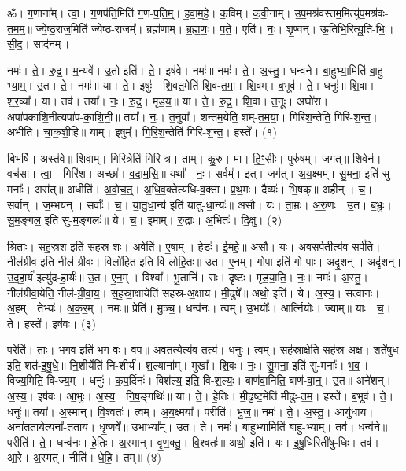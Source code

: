 
ॐ। ग॒णाना᳚म्। त्वा॒। ग॒णप॑ति॒मिति॑ ग॒ण-प॒ति॒म्॒। ह॒वा॒म॒हे॒। क॒विम्। क॒वी॒नाम्। उ॒प॒मश्र॑वस्तम॒मित्यु॑प॒मश्र॑वः-त॒म॒म्॒॥ 
ज्ये॒ष्ठ॒राज॒मिति॑ ज्येष्ठ-राजम्᳚। ब्रह्म॑णाम्। ब्र॒ह्म॒णः॒। प॒ते॒। एति॑। नः॒। शृ॒ण्वन्। ऊ॒तिभि॒रित्यू॒ति-भिः॒। सी॒द॒। साद॑नम्॥ 


नमः॑। ते॒। रु॒द्र॒। म॒न्यवे᳚। उ॒तो इति॑। ते॒। इष॑वे। नमः॑॥ 
नमः॑। ते॒। अ॒स्तु॒। धन्व॑ने। बा॒हुभ्या॒मिति॑ बा॒हु-भ्या॒म्॒। उ॒त। ते॒। नमः॑॥ 
या। ते॒। इषुः॑। शि॒वत॒मेति॑ शि॒व-त॒मा॒। शि॒वम्। ब॒भूव॑। ते॒। धनुः॑॥ 
शि॒वा। श॒र॒व्या᳚। या। तव॑। तया᳚। नः॒। रु॒द्र॒। मृ॒ड॒य॒॥ 
या। ते॒। रु॒द्र॒। शि॒वा। त॒नूः। अघो॑रा। अपा॑पकाशि॒नीत्यपा॑प-का॒शि॒नी॒॥ 
तया᳚। नः॒। त॒नुवा᳚। शन्त॑म॒येति॒ शम्-त॒म॒या॒। गिरि॑श॒न्तेति॒ गिरि॑-श॒न्त॒। अभीति॑। चा॒क॒शी॒हि॒॥ 
याम्। इषुम्᳚। गि॒रि॒श॒न्तेति॑ गिरि-श॒न्त॒। हस्ते᳚। (१)


बिभ॑र्षि। अस्त॑वे॥ 
शि॒वाम्। गि॒रि॒त्रेति॑ गिरि-त्र॒। ताम्। कु॒रु॒। मा। हि॒ꣳ॒सीः॒। पुरु॑षम्। जग॑त्॥ 
शि॒वेन॑। वच॑सा। त्वा॒। गिरि॑श। अच्छा॑। व॒दा॒म॒सि॒॥ 
यथा᳚। नः॒। सर्वम्᳚। इत्। जग॑त्। अ॒य॒क्ष्मम्। सु॒मना॒ इति॑ सु-मनाः᳚। अस॑त्॥ 
अधीति॑। अ॒वो॒च॒त्॒। अ॒धि॒व॒क्तेत्य॑धि-व॒क्ता। प्र॒थ॒मः। दैव्यः॑। भि॒षक्॥ 
अहीन्। च॒। सर्वान्। ज॒म्भयन्। सर्वाः᳚। च॒। या॒तु॒धा॒न्य॑ इति॑ यातु-धा॒न्यः॑॥ 
असौ। यः। ता॒म्रः। अ॒रु॒णः। उ॒त। ब॒भ्रुः। सु॒म॒ङ्गल॒ इति॑ सु-म॒ङ्गलः॑॥ 
ये। च॒। इ॒माम्। रु॒द्राः। अ॒भितः॑। दि॒क्षु। (२)


श्रि॒ताः। स॒ह॒स्र॒श इति॑ सहस्र-शः। अवेति॑। ए॒षा॒म्। हेडः॑। ई॒म॒हे॒॥ 
असौ। यः। अ॒व॒सर्प॒तीत्य॑व-सर्प॑ति। नील॑ग्रीव॒ इति॒ नील॑-ग्री॒वः॒। विलो॑हित॒ इति॒ वि-लो॒हि॒तः॒॥ 
उ॒त। ए॒न॒म्॒। गो॒पा इति॑ गो-पाः। अ॒दृ॒श॒न्। अदृ॑शन्। उ॒द॒हा॒र्य॑ इत्यु॑द-हा॒र्यः॑॥ 
उ॒त। ए॒न॒म्। विश्वा᳚। भू॒तानि॑। सः। दृ॒ष्टः। मृ॒ड॒या॒ति॒। नः॒॥ 
नमः॑। अ॒स्तु॒। नील॑ग्रीवा॒येति॒ नील॑-ग्री॒वा॒य॒। स॒ह॒स्रा॒क्षायेति॑ सहस्र-अ॒क्षाय॑। मी॒ढुषे᳚॥
अथो॒ इति॑। ये। अ॒स्य॒। सत्वा॑नः। अ॒हम्। तेभ्यः॑। अ॒क॒र॒म्। नमः॑॥ 
प्रेति॑। मु॒ञ्च॒। धन्व॑नः। त्वम्। उ॒भयोः᳚। आर्त्नि॑योः। ज्याम्॥ 
याः। च॒। ते॒। हस्ते᳚। इष॑वः। (३)


परेति॑। ताः। भ॒ग॒व॒ इति॑ भग-वः॒। व॒प॒॥ 
अ॒व॒तत्येत्य॑व-तत्य॑। धनुः॑। त्वम्। सह॑स्रा॒क्षेति॒ सह॑स्र-अ॒क्ष॒। शते॑षुध॒ इति॒ शत॑-इ॒षु॒धे॒॥ 
नि॒शीर्येति॑ नि-शीर्य॑। श॒ल्याना᳚म्। मुखा᳚। शि॒वः। नः॒। सु॒मना॒ इति॑ सु-मनाः᳚। भ॒व॒॥ 
विज्य॒मिति॒ वि-ज्य॒म्। धनुः॑। क॒प॒र्दिनः॑। विश॑ल्य॒ इति॒ वि-श॒ल्यः॒। बाण॑वा॒निति॒ बाण॑-वा॒न्॒। उ॒त॥ 
अने॑शन्। अ॒स्य॒। इष॑वः। आ॒भुः। अ॒स्य॒। नि॒ष॒ङ्गथिः॑॥ 
या। ते॒। हे॒तिः। मी॒ढु॒ष्ट॒मेति॑ मीढुः-त॒म॒। हस्ते᳚। ब॒भूव॑। ते॒। धनुः॑॥ 
तया᳚। अ॒स्मान्। वि॒श्वतः॑। त्वम्। अ॒य॒क्ष्मया᳚। परीति॑। भु॒ज॒॥ 
नमः॑। ते॒। अ॒स्तु॒। आयु॑धाय। अना॑तता॒येत्यना᳚-त॒ता॒य॒। धृ॒ष्णवे᳚॥ 
उ॒भाभ्या᳚म्। उत। ते॒। नमः॑। बा॒हुभ्या॒मिति॑ बा॒हु-भ्या॒म्॒। तव॑। धन्व॑ने॥ 
परीति॑। ते॒। धन्व॑नः। हे॒तिः। अ॒स्मान्। वृ॒ण॒क्तु॒। वि॒श्वतः॑॥
 अथो॒ इति॑। यः। इ॒षु॒धिरिती॑षु-धिः। तव॑। आ॒रे। अ॒स्मत्। नीति॑। धे॒हि॒। तम्॥ (४)



